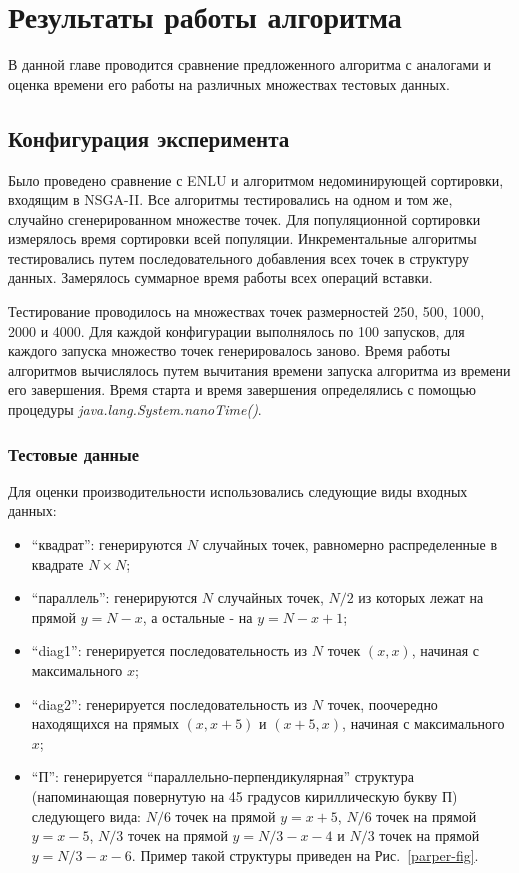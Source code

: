 \chapter{Результаты работы алгоритма}
\label{chapter3}

В данной главе проводится сравнение предложенного алгоритма с аналогами и оценка времени его работы 
на различных множествах тестовых данных.

\section{Конфигурация эксперимента}
\label{test_conf}
Было проведено сравнение с ENLU и алгоритмом недоминирующей сортировки, входящим в NSGA-II.
Все алгоритмы тестировались на одном и том же, случайно сгенерированном множестве точек.
Для популяционной сортировки измерялось время сортировки всей популяции. 
Инкрементальные алгоритмы тестировались путем последовательного добавления всех точек в структуру 
данных. Замерялось суммарное время работы всех операций вставки.

Тестирование проводилось на множествах точек размерностей 250, 500, 1000, 2000 и 4000.
Для каждой конфигурации выполнялось по 100 запусков, для каждого запуска множество точек 
генерировалось заново. Время работы алгоритмов вычислялось путем вычитания времени запуска 
алгоритма из времени его завершения. Время старта и время завершения определялись с помощью 
процедуры \textit{java.lang.System.nanoTime()}.

\subsection{Тестовые данные}
Для оценки производительности использовались следующие виды входных данных:
\begin{itemize}
    \item ``квадрат'':   генерируются $N$ случайных точек, равномерно распределенные в квадрате $N \times N$;
    \item ``параллель'': генерируются $N$ случайных точек, $N/2$ из которых лежат на прямой
                        $y = N - x$, а остальные - на $y = N - x + 1$;
    \item ``diag1'':    генерируется последовательность из $N$ точек $(x, x)$,
                        начиная с максимального $x$;
    \item ``diag2'':    генерируется последовательность из $N$ точек, поочередно находящихся на прямых
						$(x, x + 5)$ и $(x + 5, x)$, начиная с максимального $x$;
    \item ``П'':   генерируется ``параллельно-перпендикулярная'' структура (напоминающая 
				   повернутую на 45 градусов кириллическую букву \textsc{П}) следующего вида:
                        $N / 6$ точек на прямой $y = x + 5$,
                        $N / 6$ точек на прямой $y = x - 5$, 
                        $N / 3$ точек на прямой $y = N/3 - x - 4$ и
                        $N / 3$ точек на прямой $y = N/3 - x - 6$.
                   Пример такой структуры приведен на Рис.~\ref{parper-fig}.
\end{itemize}


